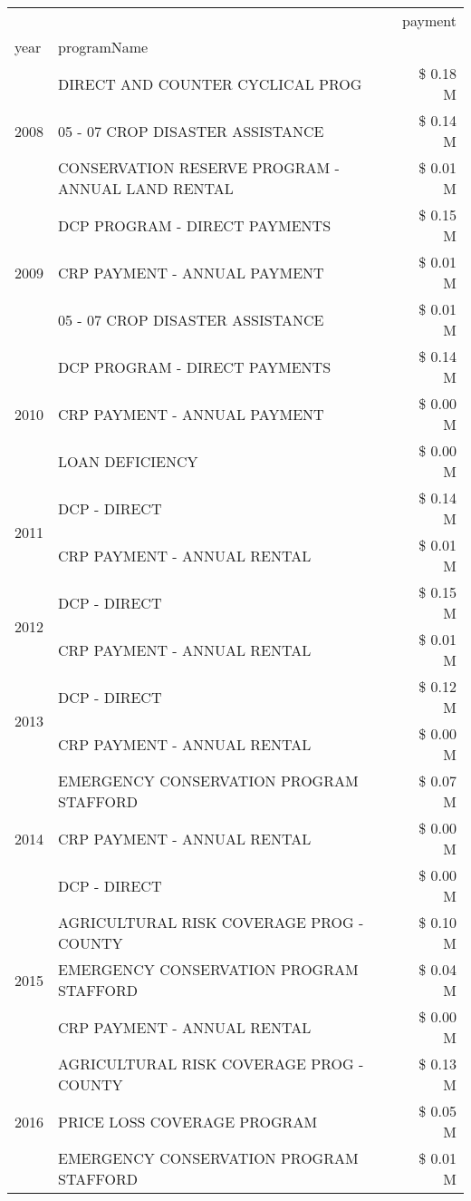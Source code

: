 \begin{tabular}{llr}
\toprule
 &  & payment \\
year & programName &  \\
\midrule
\multirow[t]{3}{*}{2008} & DIRECT AND COUNTER CYCLICAL PROG & \$ 0.18 M \\
 & 05 - 07 CROP DISASTER ASSISTANCE & \$ 0.14 M \\
 & CONSERVATION RESERVE PROGRAM - ANNUAL LAND RENTAL & \$ 0.01 M \\
\cline{1-3}
\multirow[t]{3}{*}{2009} & DCP PROGRAM - DIRECT PAYMENTS & \$ 0.15 M \\
 & CRP PAYMENT - ANNUAL PAYMENT & \$ 0.01 M \\
 & 05 - 07 CROP DISASTER ASSISTANCE & \$ 0.01 M \\
\cline{1-3}
\multirow[t]{3}{*}{2010} & DCP PROGRAM - DIRECT PAYMENTS & \$ 0.14 M \\
 & CRP PAYMENT - ANNUAL PAYMENT & \$ 0.00 M \\
 & LOAN DEFICIENCY & \$ 0.00 M \\
\cline{1-3}
\multirow[t]{2}{*}{2011} & DCP - DIRECT & \$ 0.14 M \\
 & CRP PAYMENT - ANNUAL RENTAL & \$ 0.01 M \\
\cline{1-3}
\multirow[t]{2}{*}{2012} & DCP - DIRECT & \$ 0.15 M \\
 & CRP PAYMENT - ANNUAL RENTAL & \$ 0.01 M \\
\cline{1-3}
\multirow[t]{2}{*}{2013} & DCP - DIRECT & \$ 0.12 M \\
 & CRP PAYMENT - ANNUAL RENTAL & \$ 0.00 M \\
\cline{1-3}
\multirow[t]{3}{*}{2014} & EMERGENCY CONSERVATION PROGRAM STAFFORD & \$ 0.07 M \\
 & CRP PAYMENT - ANNUAL RENTAL & \$ 0.00 M \\
 & DCP - DIRECT & \$ 0.00 M \\
\cline{1-3}
\multirow[t]{3}{*}{2015} & AGRICULTURAL RISK COVERAGE PROG - COUNTY & \$ 0.10 M \\
 & EMERGENCY CONSERVATION PROGRAM STAFFORD & \$ 0.04 M \\
 & CRP PAYMENT - ANNUAL RENTAL & \$ 0.00 M \\
\cline{1-3}
\multirow[t]{3}{*}{2016} & AGRICULTURAL RISK COVERAGE PROG - COUNTY      & \$ 0.13 M \\
 & PRICE LOSS COVERAGE PROGRAM                   & \$ 0.05 M \\
 & EMERGENCY CONSERVATION PROGRAM STAFFORD       & \$ 0.01 M \\

\end{tabular}
